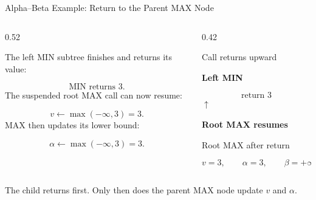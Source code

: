 \documentclass[aspectratio=169,10pt]{beamer}
\begin{document}



\begin{frame}[shrink=18]{Alpha--Beta Example: Return to the Parent MAX Node}

  \begin{columns}[T,onlytextwidth]

    \begin{column}{0.52\textwidth}

      The left MIN subtree finishes and returns its value:

      \[
        \text{MIN returns } 3.
      \]
      The suspended root MAX call can now resume:

      \[
        v \leftarrow \max(-\infty,3)=3.
      \]
      MAX then updates its lower bound:

      \[
        \alpha \leftarrow \max(-\infty,3)=3.
      \]
    \end{column}

    \begin{column}{0.42\textwidth}

      \begin{block}{Call returns upward}

        \centering

        \textbf{Left MIN}

        \[
          \boxed{\text{return }3}
        \]
        $\uparrow$

        \textbf{Root MAX resumes}

      \end{block}

      \begin{block}{Root MAX after return}

        \[
          v=3,\qquad \alpha=3,\qquad \beta=+\infty
        \]
      \end{block}

    \end{column}

  \end{columns}

  \begin{keyidea}

    The child returns first. Only then does the parent MAX node update $v$ and $\alpha$.

  \end{keyidea}

\end{frame}
\end{document}
